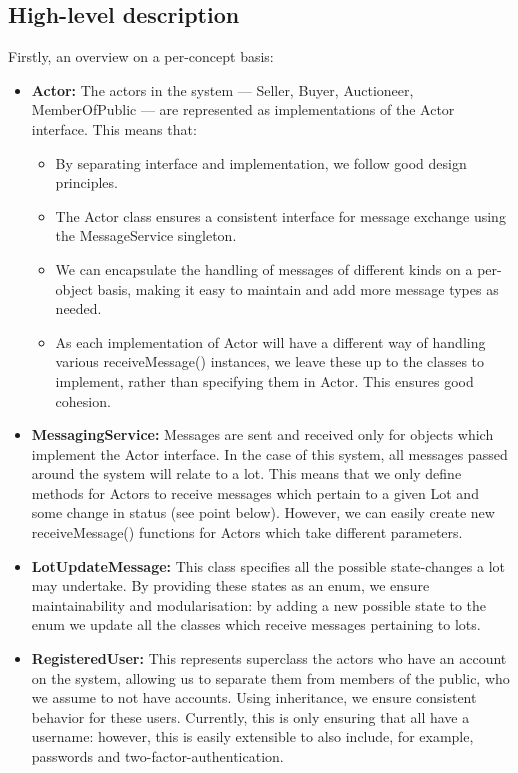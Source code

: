 \documentclass[titlepage, 12pt]{extarticle}
\begin{document}
\subsection{High-level description}
\noindent Firstly, an overview on a per-concept basis:
\begin{itemize}
\item {\bf Actor: } The actors in the system --- Seller, Buyer, Auctioneer, MemberOfPublic --- are represented as implementations of the Actor interface. This means that:
  \begin{itemize}
  \item By separating interface and implementation, we follow good design principles.
  \item The Actor class ensures a consistent interface for message exchange using the MessageService singleton.
  \item We can encapsulate the handling of messages of different kinds on a per-object basis, making it easy to maintain and add more message types as needed.
  \item As each implementation of Actor will have a different way of handling various receiveMessage() instances, we leave these up to the classes to implement, rather than specifying them in Actor. This ensures good cohesion. 
  \end{itemize}
\item {\bf MessagingService: } Messages are sent and received only for objects which implement the Actor interface. In the case of this system, all messages passed around the system will relate to a lot. This means that we only define methods for Actors to receive messages which pertain to a given Lot and some change in status (see point below). However, we can easily create new receiveMessage() functions for Actors which take different parameters. 
\item {\bf LotUpdateMessage: } This class specifies all the possible state-changes a lot may undertake. By providing these states as an enum, we ensure maintainability and modularisation: by adding a new possible state to the enum we update all the classes which receive messages pertaining to lots.
\item {\bf RegisteredUser: } This represents superclass the actors who have an account on the system, allowing us to separate them from members of the public, who we assume to not have accounts. Using inheritance, we ensure consistent behavior for these users. Currently, this is only ensuring that all have a username: however, this is easily extensible to also include, for example, passwords and two-factor-authentication.

\end{itemize}
\end{document}
